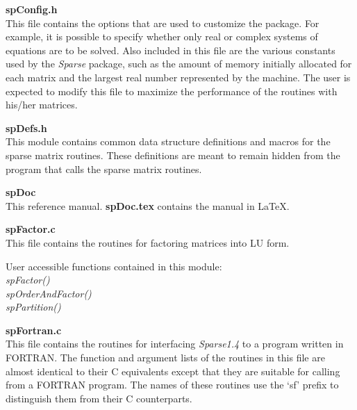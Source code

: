 \documentclass[11pt]{article}
\begin{document}
{\bf spConfig.h}\\
This file contains the options that are used to customize the package.
For example, it is possible to specify whether only real or complex
systems of equations are to be solved.  Also included in this file are
the various constants used by the \emph{Sparse} package, such as the
amount of memory initially allocated for each matrix and the largest
real number represented by the machine.  The user is expected to modify
this file to maximize the performance of the routines with his/her
matrices.

{\bf spDefs.h}\\
This module contains common data structure definitions and macros for
the sparse matrix routines.  These definitions are meant to remain
hidden from the program that calls the sparse matrix routines.

{\bf spDoc}\\
This reference manual.  {\bf spDoc.tex} contains the manual in \LaTeX.


{\bf spFactor.c}\\
This file contains the routines for factoring matrices into LU form.

User accessible functions contained in this module:\emph{\\
spFactor()\\
spOrderAndFactor()\\
spPartition()
}

{\bf spFortran.c}\\
This file contains the routines for interfacing \emph{Sparse1.4} to a
program written in FORTRAN.  The function and argument lists of the
routines in this file are almost identical to their C equivalents
except that they are suitable for calling from a FORTRAN program.
The names of these routines use the `sf' prefix to distinguish them
from their C counterparts.
\end{document}

